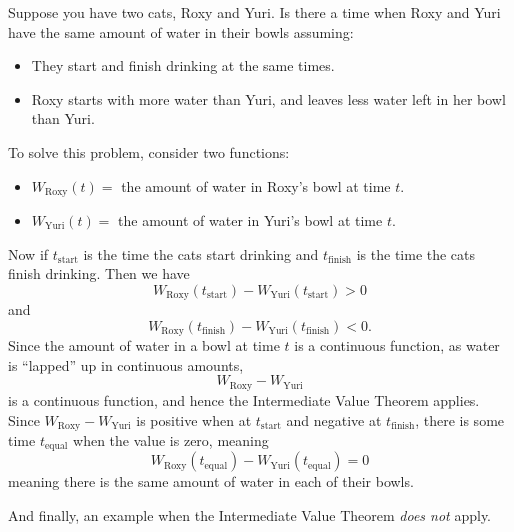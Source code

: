 \documentclass{ximera}
\begin{document}
\begin{example}
	Suppose you have two cats, Roxy and Yuri. Is there a time when Roxy
	and Yuri have the same amount of water in their bowls assuming:
	  \begin{itemize}
		  \item They start and finish drinking at the same times.
		  \item Roxy starts with more water than Yuri, and leaves less water
			    left in her bowl than Yuri.
	  \end{itemize}

	\begin{explanation} 
		  To solve this problem, consider two functions:
		  \begin{itemize}
			    \item $W_{\mathrm{Roxy}}(t) =$ the amount of water in Roxy's bowl at time $t$.
			    \item $W_{\mathrm{Yuri}}(t) =$ the amount of water in Yuri's bowl at time $t$.
		  \end{itemize}
		  Now if $t_\mathrm{start}$ is the time the cats start drinking and
		  $t_\mathrm{finish}$ is the time the cats finish drinking. Then we have
		  \[
		  W_\mathrm{Roxy}(t_\mathrm{start})-W_{\mathrm{Yuri}}(t_\mathrm{start}) > 0%
		  \]
		  and
		  \[
		  W_\mathrm{Roxy}(t_\mathrm{finish})-W_{\mathrm{Yuri}}(t_\mathrm{finish}) < 0.
		  \]
		  Since the amount of water in a bowl at time $t$ is a continuous
		  function, as water is ``lapped'' up in continuous amounts,
		  \[
		  W_\mathrm{Roxy}-W_{\mathrm{Yuri}}
		  \]
		  is a continuous function, and hence the Intermediate Value Theorem
		  applies. Since $W_\mathrm{Roxy}-W_{\mathrm{Yuri}}$ is positive when
		  at $t_\mathrm{start}$ and negative at $t_\mathrm{finish}$, there is
		  some time $t_\mathrm{equal}$ when the value is zero, meaning
		  \[
		  W_\mathrm{Roxy}(t_\mathrm{equal})-  W_{\mathrm{Yuri}}(t_\mathrm{equal}) =0
		  \]
		  meaning there is the same amount of water in each of their bowls.
	\end{explanation}
\end{example}


And finally, an example when the Intermediate Value Theorem \textit{does not} apply.
\end{document}
